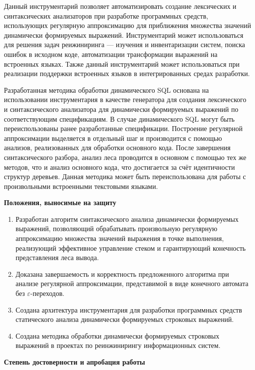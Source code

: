 Данный инструментарий позволяет автоматизировать создание лексических и синтаксических анализаторов при разработке программных средств, использующих регулярную аппроксимацию для приближения множества значений динамически формируемых выражений. Инструментарий может использоваться для решения задач реижиниринга --- изучения и инвентаризации систем, поиска ошибок в исходном коде, автоматизации трансформации выражений на встроенных языках. Также данный инструментарий может использоваться при реализации поддержки встроенных языков в интегрированных средах разработки.

Разработанная методика обработки динамического SQL основана на использовании инструментария в качестве генератора для создания лексического и синтаксического анализатора для динамически формируемых выражений по соответствующим спецификациям. В случае динамического SQL могут быть переиспользованы ранее разработанные спецификации. Построение регулярной аппроксимации выделяется в отдельный шаг и производится с помощью анализов, реализованных для обработки основного кода. После завершения синтаксического разбора, анализ леса проводится в основном с помощью тех же методов, что и анализ основного кода, что достигается за счёт идентичности структур деревьев. Данная методика может быть переиспользована для работы с произвольными встроенными текстовыми языками.

\textbf{Положения, выносимые на защиту}
\begin{enumerate}
    \item Разработан алгоритм синтаксического анализа динамически формируемых выражений, позволяющий обрабатывать произвольную регулярную аппроксимацию множества значений выражения в точке выполнения, реализующий эффективное управление стеком и гарантирующий конечность представления леса вывода. 
    \item Доказана завершаемость и корректность предложенного алгоритма при анализе регулярной аппроксимации, представимой в виде конечного автомата без $\varepsilon$-переходов.
    \item Создана архитектура инструментария для разработки программных средств статического анализа динамически формируемых строковых выражений.
    \item Создана методика обработки динамически формируемых строковых выражений в проектах по реинжинирингу информационных систем.
\end{enumerate}


\textbf{Степень достоверности и апробация работы}

